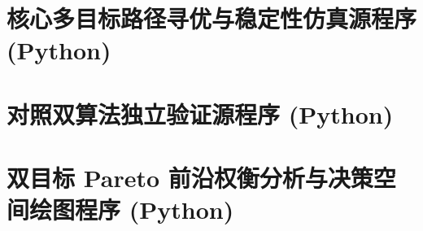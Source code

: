 \documentclass{cumcmthesis}
\begin{document}
\newpage
\begin{appendices}

\section{核心多目标路径寻优与稳定性仿真源程序 (Python)}


\section{对照双算法独立验证源程序 (Python)}


\section{双目标 Pareto 前沿权衡分析与决策空间绘图程序 (Python)}


\end{appendices}
\end{document}
